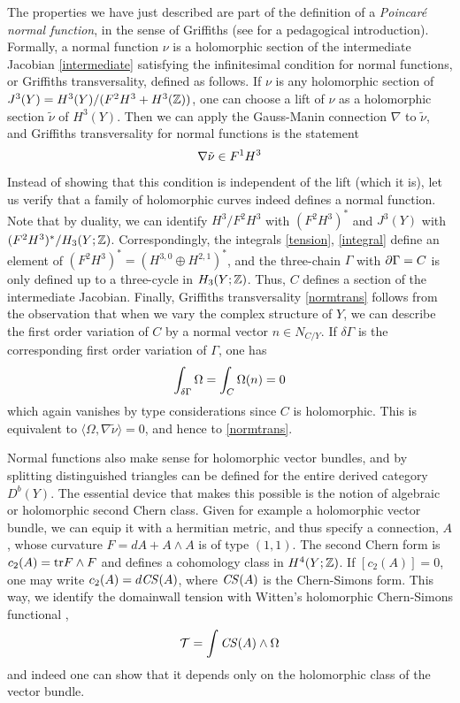 The properties we have just described are part of the definition of a 
{\it Poincar\'e normal function}, in the sense of Griffiths \cite{griffiths1} 
(see \cite{cime} for a pedagogical introduction). Formally, a normal
function $\nu$ is a holomorphic section of the intermediate
Jacobian \eqref{intermediate} satisfying the infinitesimal condition 
for normal functions, or Griffiths transversality, defined as follows.
If $\nu$ is any holomorphic section of $J^3(Y)=H^3(Y)/(F^2H^3+H^3({\mathbb Z}))$, 
one can choose a lift of $\nu$ as a holomorphic section $\tilde\nu$ of 
$H^3(Y)$. Then we can apply the Gauss-Manin connection $\nabla$ to 
$\tilde\nu$, and Griffiths transversality for normal functions is the 
statement
\begin{equation}
\eqlabel{normtrans}
\nabla\tilde\nu \in F^1H^3 
\end{equation}
Instead of showing that this condition is independent of the lift
(which it is), let us verify that a family of holomorphic curves indeed 
defines a normal function. Note that by duality, we can identify 
$H^3/F^2H^3$ with $(F^2H^3)^*$ and $J^3(Y)$ with $(F^2H^3)^*/H_3(Y;
{\mathbb Z})$. Correspondingly, the integrals \eqref{tension}, \eqref{integral} 
define an element of $(F^2H^3)^*=(H^{3,0}\oplus H^{2,1})^*$, and
the three-chain $\Gamma$ with $\partial\Gamma=C$ is only defined up to a 
three-cycle in $H_3(Y;{\mathbb Z})$. Thus, $C$ defines a section of the 
intermediate Jacobian. Finally, Griffiths transversality \eqref{normtrans} 
follows from the observation that when we vary the complex structure
of $Y$, we can describe the first order variation of $C$ by a normal 
vector $n\in N_{C/Y}$. If $\delta\Gamma$ is the corresponding first
order variation of $\Gamma$, one has
\begin{equation}
\eqlabel{equivalent}
\int_{\delta\Gamma} \Omega = \int_C \Omega(n) = 0
\end{equation}
which again vanishes by type considerations since $C$ is holomorphic.
This is equivalent to $\langle\Omega,\nabla\tilde\nu\rangle=0$, and 
hence to \eqref{normtrans}.

Normal functions also make sense for holomorphic vector bundles, and 
by splitting distinguished triangles can be defined for the entire 
derived category $D^b(Y)$. The essential device that makes this possible 
is the notion of algebraic or holomorphic second Chern class. Given 
for example a holomorphic vector bundle, we can equip it with a 
hermitian metric, and thus specify a connection, $A$, whose curvature 
$F=dA+A\wedge A$ is of type $(1,1)$. The second Chern form is
$c_2(A) = {\rm tr} F\wedge F$ and defines a cohomology class in 
$H^4(Y;{\mathbb Z})$. If $[c_2(A)]=0$, one may write $c_2(A)=d {\it CS}(A)$, where 
${\it CS}(A)$ is the Chern-Simons form. This way, we identify the domainwall 
tension with Witten's holomorphic Chern-Simons functional \cite{newissue,
wittencs,doth},
\begin{equation}
\eqlabel{holcs}
\calt = \int {\it CS}(A)\wedge \Omega
\end{equation}
and indeed one can show that it depends only on the holomorphic class
of the vector bundle.

